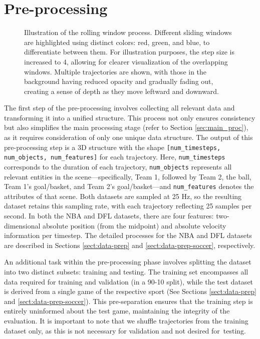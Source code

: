 \section{Pre-processing}
\label{sec:preprocessing}

\begin{figure}
    \centering
    
    \caption[Illustration of the rolling window process with colored windows and increased step size for clarity.]{Illustration of the rolling window process. Different sliding windows are highlighted using distinct colors: red, green, and blue, to differentiate between them. For illustration purposes, the step size is increased to 4, allowing for clearer visualization of the overlapping windows. Multiple trajectories are shown, with those in the background having reduced opacity and gradually fading out, creating a sense of depth as they move leftward and downward.}
    \label{fig:preprocessing}
\end{figure}

The first step of the pre-processing involves collecting all relevant data and transforming it into a unified structure. This process not only ensures consistency but also simplifies the main processing stage (refer to Section \ref{sec:main_proc}), as it requires consideration of only one unique data structure. The output of this pre-processing step is a 3D structure with the shape \texttt{[num\_timesteps, num\_objects, num\_features]} for each trajectory. Here, \texttt{num\_timesteps} corresponds to the duration of each trajectory, \texttt{num\_objects} represents all relevant entities in the scene—specifically, Team 1, followed by Team 2, the ball, Team 1's goal/basket, and Team 2's goal/basket—and \texttt{num\_features} denotes the attributes of that scene. Both datasets are sampled at 25 Hz, so the resulting dataset retains this sampling rate, with each trajectory reflecting 25 samples per second. In both the NBA and DFL datasets, there are four features: two-dimensional absolute position (from the midpoint) and absolute velocity information per timestep. The detailed processes for the NBA and DFL datasets are described in Sections \ref{sect:data-prep} and \ref{sect:data-prep-soccer}, respectively.

An additional task within the pre-processing phase involves splitting the dataset into two distinct subsets: training and testing. The training set encompasses all data required for training and validation (in a 90-10 split), while the test dataset is derived from a single game of the respective sport (See Sections \ref{sect:data-prep} and \ref{sect:data-prep-soccer}). This pre-separation ensures that the training step is entirely uninformed about the test game, maintaining the integrity of the evaluation. It is important to note that we shuffle trajectories from the training dataset only, as this is not necessary for validation and not desired for~testing.

